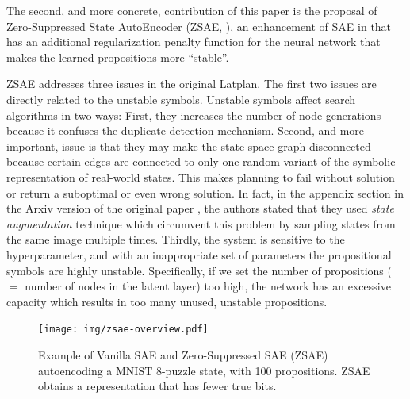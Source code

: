 The second, and more concrete, contribution of this paper is
the proposal of Zero-Suppressed State AutoEncoder (ZSAE, ), an enhancement of SAE in \latentplanner
that has an additional regularization penalty function for the neural network 
that makes the learned propositions more ``stable''.

ZSAE addresses three issues in the original Latplan.
The first two issues are directly related to the unstable symbols.
Unstable symbols affect search algorithms in two ways:
First, they increases the number of node generations because
it confuses the duplicate detection mechanism.
Second, and more important, issue is that they may make the state space graph disconnected because certain edges
are connected to only one random variant of the symbolic representation of real-world states.
This makes planning to fail without solution or return a suboptimal or even wrong solution.
In fact, in the appendix section in the Arxiv version of the original paper \cite{Asai2018},
the authors stated that they used \emph{state augmentation} technique
which circumvent this problem by sampling states from the same image multiple times.
Thirdly, the system is sensitive to the hyperparameter, and with an inappropriate set of parameters
the propositional symbols are highly unstable.
Specifically, if we set the number of propositions ($=$ number of nodes in the latent layer) too high, the network
has an excessive capacity which results in too many unused, unstable propositions.

\begin{figure}[htb]
 \centering
 \texttt{[image: img/zsae-overview.pdf]}
 \caption{
Example of Vanilla SAE and Zero-Suppressed SAE (ZSAE) autoencoding a MNIST 8-puzzle state, with 100 propositions.
ZSAE obtains a representation that has fewer true bits.}
 \label{zsae-overview}
\end{figure}


% 

